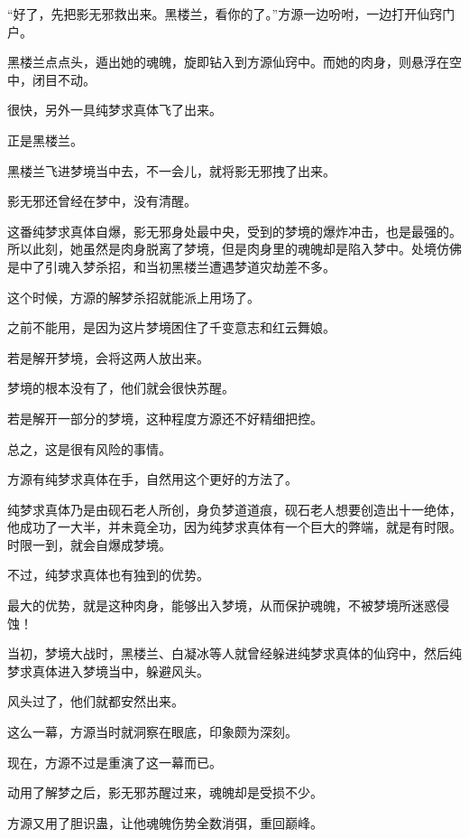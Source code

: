 
\begin{this_body}

“好了，先把影无邪救出来。黑楼兰，看你的了。”方源一边吩咐，一边打开仙窍门户。

黑楼兰点点头，遁出她的魂魄，旋即钻入到方源仙窍中。而她的肉身，则悬浮在空中，闭目不动。

很快，另外一具纯梦求真体飞了出来。

正是黑楼兰。

黑楼兰飞进梦境当中去，不一会儿，就将影无邪拽了出来。

影无邪还曾经在梦中，没有清醒。

这番纯梦求真体自爆，影无邪身处最中央，受到的梦境的爆炸冲击，也是最强的。所以此刻，她虽然是肉身脱离了梦境，但是肉身里的魂魄却是陷入梦中。处境仿佛是中了引魂入梦杀招，和当初黑楼兰遭遇梦道灾劫差不多。

这个时候，方源的解梦杀招就能派上用场了。

之前不能用，是因为这片梦境困住了千变意志和红云舞娘。

若是解开梦境，会将这两人放出来。

梦境的根本没有了，他们就会很快苏醒。

若是解开一部分的梦境，这种程度方源还不好精细把控。

总之，这是很有风险的事情。

方源有纯梦求真体在手，自然用这个更好的方法了。

纯梦求真体乃是由砚石老人所创，身负梦道道痕，砚石老人想要创造出十一绝体，他成功了一大半，并未竟全功，因为纯梦求真体有一个巨大的弊端，就是有时限。时限一到，就会自爆成梦境。

不过，纯梦求真体也有独到的优势。

最大的优势，就是这种肉身，能够出入梦境，从而保护魂魄，不被梦境所迷惑侵蚀！

当初，梦境大战时，黑楼兰、白凝冰等人就曾经躲进纯梦求真体的仙窍中，然后纯梦求真体进入梦境当中，躲避风头。

风头过了，他们就都安然出来。

这么一幕，方源当时就洞察在眼底，印象颇为深刻。

现在，方源不过是重演了这一幕而已。

动用了解梦之后，影无邪苏醒过来，魂魄却是受损不少。

方源又用了胆识蛊，让他魂魄伤势全数消弭，重回巅峰。


\end{this_body}
